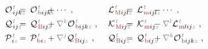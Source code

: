 \begin{subequations} \label{eq:multipole-modify}
\begin{align}
	&{\mathcal{O}}^{\;\!\mathcolor{gray}{t}}_{\;\! ijk \mathcolor{gray}{z}} \hspace{-2.0em}&&=\hspace{0.2em} {\mathcal{O}}^{\;\!\mathcolor{gray}{t}}_{\;\!\textcolor{Maroon}{\text{b}} ijk \mathcolor{gray}{z}} &&\hspace{-2.0em}+ \cdots~, &&\hspace{0.3em} {\mathcal{L}}^{\;\!\mathcolor{gray}{t}}_{\;\!\textcolor{Maroon}{\text{M}} ijl \mathcolor{gray}{z}} \hspace{-2.0em}&&=\hspace{0.2em} {\mathcal{L}}^{\;\!\mathcolor{gray}{t}}_{\;\!\textcolor{Maroon}{\text{m}} ijl \mathcolor{gray}{z}} &&\hspace{-2.0em}- \cdots~, \label{eq:Ob-LM} \\
	&{\mathcal{Q}}^{\;\!\mathcolor{gray}{t}}_{\;\! ij \mathcolor{gray}{z}} \hspace{-2.0em}&&=\hspace{0.2em} {\mathcal{Q}}^{\;\!\mathcolor{gray}{t}}_{\;\!\textcolor{Maroon}{\text{B}} ij \mathcolor{gray}{z}} &&\hspace{-2.0em}+ \mathcolor{gray}{\nabla^k} {\mathcal{O}}^{\;\!\mathcolor{gray}{t}}_{\;\!\textcolor{Maroon}{\text{b}} ijk \mathcolor{gray}{z}}~,  &&\hspace{0.3em} {\mathcal{K}}^{\;\!\mathcolor{gray}{t}}_{\;\!\textcolor{Maroon}{\text{M}} ij \mathcolor{gray}{z}} \hspace{-2.0em}&&=\hspace{0.2em} {\mathcal{K}}^{\;\!\mathcolor{gray}{t}}_{\;\!\textcolor{Maroon}{\text{m}} ij \mathcolor{gray}{z}} &&\hspace{-2.0em}- \mathcolor{gray}{\nabla^l} {\mathcal{L}}^{\;\!\mathcolor{gray}{t}}_{\;\!\textcolor{Maroon}{\text{m}} lij \mathcolor{gray}{z}}~, \label{eq:Qb-KM} \\
	&{\mathcal{P}}^{\;\!\mathcolor{gray}{t}}_{\;\! i \mathcolor{gray}{z}} \hspace{-2.0em}&&=\hspace{0.2em} {\mathcal{P}}^{\;\!\mathcolor{gray}{t}}_{\;\!\textcolor{Maroon}{\text{b}} i \mathcolor{gray}{z}} &&\hspace{-2.0em}+ \mathcolor{gray}{\nabla^j} {\mathcal{Q}}^{\;\!\mathcolor{gray}{t}}_{\;\!\textcolor{Maroon}{\text{B}} ij \mathcolor{gray}{z}}~, &&\hspace{0.3em} {\mathcal{Q}}^{\;\!\mathcolor{gray}{t}}_{\;\!\textcolor{Maroon}{\text{B}} ij \mathcolor{gray}{z}} \hspace{-2.0em}&&=\hspace{0.2em} {\mathcal{Q}}^{\;\!\mathcolor{gray}{t}}_{\;\!\textcolor{Maroon}{\text{b}} ij \mathcolor{gray}{z}} &&\hspace{-2.0em}+ \mathcolor{gray}{\nabla^k} {\mathcal{O}}^{\;\!\mathcolor{gray}{t}}_{\;\!\textcolor{Maroon}{\text{b}} ijk \mathcolor{gray}{z}}~, \label{eq:Pb-QB} \\

\end{align}
\end{subequations}

